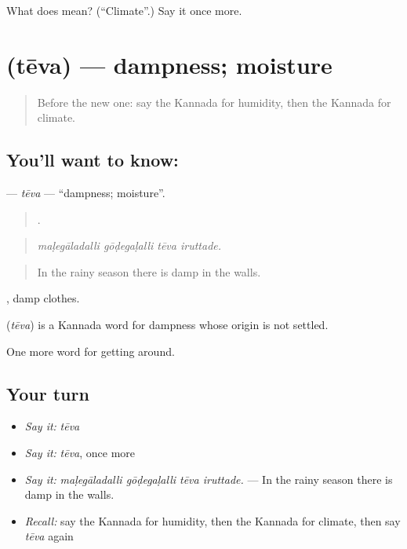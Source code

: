 \begin{tcolorbox}[breakable,colback=teal!4,colframe=teal!35!black,title={Before you move on}]
What does  mean? (\textquotedblleft{}Climate\textquotedblright{}.) Say it once more.
\end{tcolorbox}
\section[\texorpdfstring{\kn{ತೇವ} (tēva)}{ತೇವ (tēva)}]{ (tēva) — dampness; moisture}

\label{lesson:KA-C484-teva}



\begin{quote}
Before the new one: say the Kannada for humidity, then the Kannada for climate.
\end{quote}

\subsection*{You'll want to know: }
\textbf{} — \emph{tēva} — \textquotedblleft{}dampness; moisture\textquotedblright{}.

\begin{quote}
   .
\end{quote}

\begin{quote}
\emph{maḷegāladalli gōḍegaḷalli tēva iruttade.}
\end{quote}

\begin{quote}
In the rainy season there is damp in the walls.
\end{quote}

 , damp clothes.

\begin{cousinweb}
\textbf{} (\emph{tēva}) is a Kannada word for dampness whose origin is not settled.
\end{cousinweb}

\begin{grammarlens}[title={What you've built}]
One more word for getting around.
\end{grammarlens}

\subsection*{Your turn}
\begin{itemize}
\raggedright
  \item \emph{Say it:} \emph{tēva}
  \item \emph{Say it:} \emph{tēva}, once more
  \item \emph{Say it:} \emph{maḷegāladalli gōḍegaḷalli tēva iruttade.} — In the rainy season there is damp in the walls.
  \item \emph{Recall:} say the Kannada for humidity, then the Kannada for climate, then say \emph{tēva} again
\end{itemize}

